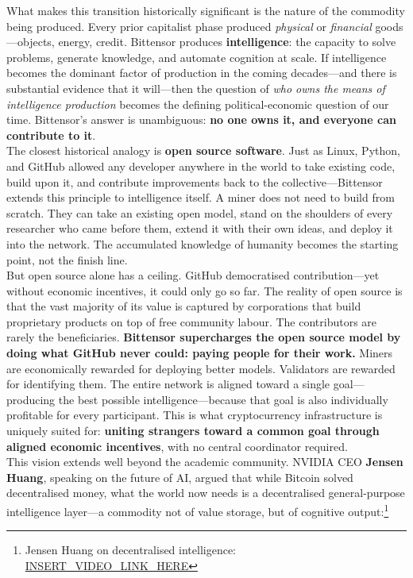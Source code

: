 \documentclass[12pt, a4paper, oneside]{report}
\theoremstyle{definition}
\begin{document}
What makes this transition historically significant is the nature of the 
commodity being produced. Every prior capitalist phase produced \emph{physical} 
or \emph{financial} goods—objects, energy, credit. Bittensor produces 
\textbf{intelligence}: the capacity to solve problems, generate knowledge, 
and automate cognition at scale. If intelligence becomes the dominant factor 
of production in the coming decades—and there is substantial evidence that 
it will—then the question of \emph{who owns the means of intelligence 
production} becomes the defining political-economic question of our time. 
Bittensor's answer is unambiguous: \textbf{no one owns it, and everyone 
can contribute to it}.\\[0.4cm]

The closest historical analogy is \textbf{open source software}. Just as 
Linux, Python, and GitHub allowed any developer anywhere in the world to 
take existing code, build upon it, and contribute improvements back to the 
collective—Bittensor extends this principle to intelligence itself. A miner 
does not need to build from scratch. They can take an existing open model, 
stand on the shoulders of every researcher who came before them, extend it 
with their own ideas, and deploy it into the network. The accumulated 
knowledge of humanity becomes the starting point, not the finish line.\\[0.4cm]

But open source alone has a ceiling. GitHub democratised contribution—yet 
without economic incentives, it could only go so far. The reality of open 
source is that the vast majority of its value is captured by corporations 
that build proprietary products on top of free community labour. The 
contributors are rarely the beneficiaries. \textbf{Bittensor supercharges 
the open source model by doing what GitHub never could: paying people for 
their work.} Miners are economically rewarded for deploying better models. 
Validators are rewarded for identifying them. The entire network is aligned 
toward a single goal—producing the best possible intelligence—because that 
goal is also individually profitable for every participant. This is what 
cryptocurrency infrastructure is uniquely suited for: \textbf{uniting 
strangers toward a common goal through aligned economic incentives}, with 
no central coordinator required.\\[0.4cm]

This vision extends well beyond the academic community. NVIDIA CEO 
\textbf{Jensen Huang}, speaking on the future of AI, argued 
that while Bitcoin solved decentralised money, what the world now needs is 
a decentralised general-purpose intelligence layer—a commodity not of value 
storage, but of cognitive output:\footnote{Jensen Huang on decentralised 
intelligence: \url{INSERT_VIDEO_LINK_HERE}}\\[0.4cm]
\end{document}

